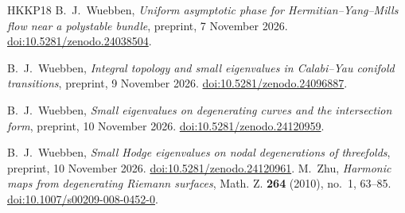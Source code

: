 \begin{thebibliography}{HKKP18}
B.~J.~Wuebben, \emph{Uniform asymptotic phase for Hermitian--Yang--Mills flow near a polystable bundle},
preprint, 7 November 2026.
\href{https://doi.org/10.5281/zenodo.24038504}{doi:10.5281/zenodo.24038504}.

B.~J.~Wuebben, \emph{Integral topology and small eigenvalues in Calabi--Yau conifold transitions},
preprint, 9 November 2026.
\href{https://doi.org/10.5281/zenodo.24096887}{doi:10.5281/zenodo.24096887}.

B.~J.~Wuebben, \emph{Small eigenvalues on degenerating curves and the intersection form},
preprint, 10 November 2026.
\href{https://doi.org/10.5281/zenodo.24120959}{doi:10.5281/zenodo.24120959}.

B.~J.~Wuebben, \emph{Small Hodge eigenvalues on nodal degenerations of threefolds},
preprint, 10 November 2026.
\href{https://doi.org/10.5281/zenodo.24120961}{doi:10.5281/zenodo.24120961}.
M.~Zhu, \emph{Harmonic maps from degenerating Riemann surfaces},
Math. Z. \textbf{264} (2010), no.~1, 63--85.
\href{https://doi.org/10.1007/s00209-008-0452-0}{doi:10.1007/s00209-008-0452-0}.
\end{thebibliography}
